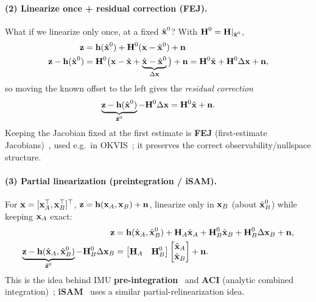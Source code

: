 \paragraph{(2) Linearize once + residual correction (FEJ).} What if we linearize only once, at a fixed $\hat{\vect{x}}^{0}$? With $\vect{H}^{0} = \vect{H}|_{\hat{\vect{x}}^{0}}$,
\begin{align}
\vect{z} &= \vect{h}(\hat{\vect{x}}^{0}) + \vect{H}^{0}(\vect{x}-\hat{\vect{x}}^{0}) + \vect{n} \\
\vect{z} - \vect{h}(\hat{\vect{x}}^{0}) &= \vect{H}^{0}\big(\vect{x} - \hat{\vect{x}} + \underbrace{\hat{\vect{x}} - \hat{\vect{x}}^{0}}_{\Delta\vect{x}}\big) + \vect{n}
= \vect{H}^{0}\tilde{\vect{x}} + \vect{H}^{0}\Delta\vect{x} + \vect{n},
\end{align}
so moving the known offset to the left gives the \emph{residual correction}
\begin{align}
\underbrace{\vect{z} - \vect{h}(\hat{\vect{x}}^{0})}_{\tilde{\vect{z}}^{0}} - \vect{H}^{0}\Delta\vect{x} = \vect{H}^{0}\tilde{\vect{x}} + \vect{n}.
\end{align}
Keeping the Jacobian fixed at the first estimate is \textbf{FEJ} (first-estimate Jacobians)~\cite{Huang2008ISER}, used e.g.\ in OKVIS~\cite{Leutenegger2014IJRR}; it preserves the correct observability/nullspace structure.

\paragraph{(3) Partial linearization (preintegration / iSAM).} For $\vect{x} = [\vect{x}_A\trans,\vect{x}_B\trans]\trans$, $\vect{z} = \vect{h}(\vect{x}_A,\vect{x}_B)+\vect{n}$, linearize only in $\vect{x}_B$ (about $\hat{\vect{x}}_B^{0}$) while keeping $\vect{x}_A$ exact:
\begin{align}
\vect{z} &= \vect{h}(\hat{\vect{x}}_A,\hat{\vect{x}}_B^{0}) + \vect{H}_A\tilde{\vect{x}}_A + \vect{H}_B^{0}\tilde{\vect{x}}_B + \vect{H}_B^{0}\Delta\vect{x}_B + \vect{n}, \\
\underbrace{\vect{z} - \vect{h}(\hat{\vect{x}}_A,\hat{\vect{x}}_B^{0})}_{\tilde{\vect{z}}^{0}} - \vect{H}_B^{0}\Delta\vect{x}_B
&= \begin{bmatrix} \vect{H}_A & \vect{H}_B^{0} \end{bmatrix}\begin{bmatrix} \tilde{\vect{x}}_A \\ \tilde{\vect{x}}_B \end{bmatrix} + \vect{n}.
\end{align}
This is the idea behind IMU \textbf{pre-integration}~\cite{Forster2017tro} and \textbf{ACI} (analytic combined integration)~\cite{Eckenhoff2017ICRA}; \textbf{iSAM}~\cite{Kaess2012IJRR} uses a similar partial-relinearization idea.

